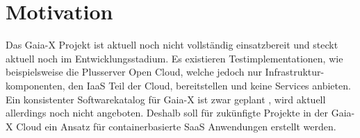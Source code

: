 \section{Motivation}
\label{sec:einleitung:motivation}
Das Gaia-X Projekt ist aktuell noch nicht vollständig einsatzbereit und steckt aktuell noch im Entwicklungsstadium.
Es existieren Testimplementationen, wie beispielsweise die Plusserver Open Cloud, welche jedoch nur Infrastruktur-
komponenten, den \ac{IaaS} Teil der Cloud, bereitstellen und keine Services anbieten. Ein konsistenter Softwarekatalog für Gaia-X ist zwar geplant \cite{BMWi2019},
wird aktuell allerdings noch nicht angeboten. Deshalb soll für zukünfigte Projekte in der Gaia-X Cloud ein Ansatz
für containerbasierte \ac{SaaS} Anwendungen erstellt werden.